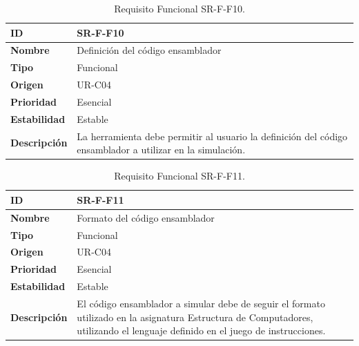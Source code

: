 \begin{center}
\begin{table}[htbp]
\centering
\begin{tabular}{@{}p{2.5cm} p{9cm}@{}} 
\toprule
\textbf{ID} 				& SR-F-F10 \\
\midrule
\textbf{Nombre} 			& Definición del código ensamblador\\
\midrule
\textbf{Tipo} 			& Funcional \\
\midrule
\textbf{Origen} 			& UR-C04 \\
\midrule
\textbf{Prioridad}		& Esencial \\
\midrule
\textbf{Estabilidad} 		& Estable \\
\midrule
\textbf{Descripción} 	& La herramienta debe permitir al usuario la definición del código ensamblador a utilizar en la simulación. \\
\bottomrule
\end{tabular}
\caption{Requisito Funcional SR-F-F10.}
\label{tab:srff10}
\end{table}
\end{center}

\begin{center}
\begin{table}[htbp]
\centering
\begin{tabular}{@{}p{2.5cm} p{9cm}@{}} 
\toprule
\textbf{ID} 				& SR-F-F11 \\
\midrule
\textbf{Nombre} 			& Formato del código ensamblador\\
\midrule
\textbf{Tipo} 			& Funcional \\
\midrule
\textbf{Origen} 			& UR-C04 \\
\midrule
\textbf{Prioridad}		& Esencial \\
\midrule
\textbf{Estabilidad} 		& Estable \\
\midrule
\textbf{Descripción} 	& El código ensamblador a simular debe de seguir el formato utilizado en la asignatura Estructura de Computadores, utilizando el lenguaje definido en el juego de instrucciones.\\
\bottomrule
\end{tabular}
\caption{Requisito Funcional SR-F-F11.}
\label{tab:srff11}
\end{table}
\end{center}

